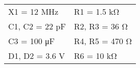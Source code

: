 \documentclass{kibot}
\begin{document}
\begin{center}
~\\
~\\
\\
~\\
~\\
\begin{tabular}{ll}
X1 = 12 \si{\mega\hertz}     & R1 = 1.5 \si{\kilo\ohm}\\
C1, C2 = 22 \si{\pico\farad} & R2, R3 = 36 \si{\ohm}\\
C3 = 100 \si{\micro\farad}   & R4, R5 = 470 \si{\ohm}\\
D1, D2 = 3.6 \si{\volt}      & R6 = 10 \si{\kilo\ohm}
\end{tabular}\\
~\\
~\\
\end{center}
\end{document}

